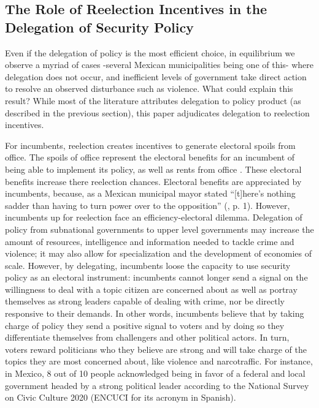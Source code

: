   
\subsection{The Role of Reelection Incentives in the Delegation of Security Policy \label{sec:reelection_incentives}}

Even if the delegation of policy is the most efficient choice, in equilibrium we observe a myriad of cases -several Mexican municipalities being one of this- where delegation does not occur, and inefficient levels of government take direct action to resolve an observed disturbance such as violence. What could explain this result? While most of the literature  attributes delegation to policy product (as described in the previous section), this paper adjudicates delegation to reelection incentives.   

For incumbents, reelection creates incentives to generate electoral spoils from office. The spoils of office represent the electoral benefits for an incumbent of being able to implement its policy, as well as rents from office \citep{lizzeri_2001}. These electoral benefits increase there reelection chances. Electoral benefits are appreciated by incumbents, because, as a Mexican municipal mayor stated ``[t]here's nothing sadder than having to turn power over to the opposition'' (\citet{grindle_2009}, p. 1). However, incumbents up for reelection face an efficiency-electoral dilemma. Delegation of policy from subnational governments to upper level governments may increase the amount of resources, intelligence and information needed to tackle crime and violence; it may also allow for specialization and the development of economies of scale. However, by delegating, incumbents loose the capacity to use security policy as an electoral instrument: incumbents cannot longer send a signal on the willingness to deal with a topic citizen are concerned about as well as portray themselves as strong leaders capable of dealing with crime, nor be directly responsive to their demands. In other words, incumbents believe that by taking charge of policy they send a positive signal to voters and by doing so they differentiate themselves from challengers and other political actors. In turn, voters reward politicians who they believe are strong and will take charge of the topics they are most concerned about, like violence and narcotraffic. For instance, in Mexico, 8 out of 10 people acknowledged being in favor of a federal and local government headed by a strong political leader according to the National Survey on Civic Culture 2020 (ENCUCI for its acronym in Spanish).%

